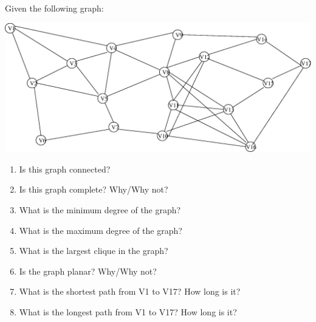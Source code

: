 \documentclass[12pt]{article}
\newenvironment{solution}[2][Solution]{ \begin{trivlist}
\item[\hskip \labelsep {\bfseries #1}]}{\end{trivlist}}
\newenvironment{problem}[2][Problem]{\begin{trivlist}
\item[\hskip \labelsep {\bfseries #1}\hskip \labelsep {\bfseries #2.}]}{\end{trivlist}}
\begin{document}
\vskip 0.5in
\newpage
\pagebreak
\pagebreak\newpage

\begin{problem}{4} Given the following graph:

\begin{center}
\includegraphics[scale=0.7]{graph.eps}
\end{center}
\begin{enumerate}
    \item Is this graph connected?

    \item Is this graph complete?  Why/Why not?

    \item What is the minimum degree of the graph?

    \item What is the maximum degree of the graph?

    \item What is the largest clique in the graph?

    \item Is the graph planar? Why/Why not?

    \item What is the shortest path from V1 to V17? How long is it?

    \item What is the longest path from V1 to V17?  How long is it?
\end{enumerate}
\end{problem}
\begin{solution}{4}
\item[]
\end{solution}

\vskip 0.5in
\pagebreak


\end{document}

